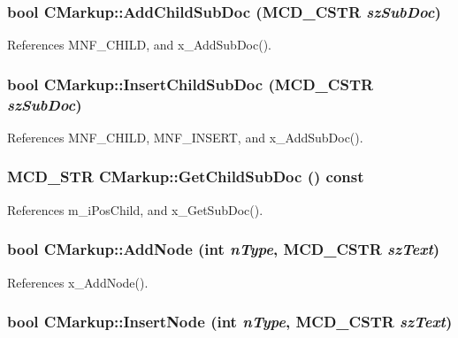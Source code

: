 \subsubsection[AddChildSubDoc]{\setlength{\rightskip}{0pt plus 5cm}bool CMarkup::AddChildSubDoc ({\bf MCD\_\-CSTR} {\em szSubDoc})\hspace{0.3cm}{\tt  [inline]}}\label{classCMarkup_3500f6d0c1ea550bfd70c0dc0b1217c2}




References MNF\_\-CHILD, and x\_\-AddSubDoc().
\subsubsection[InsertChildSubDoc]{\setlength{\rightskip}{0pt plus 5cm}bool CMarkup::InsertChildSubDoc ({\bf MCD\_\-CSTR} {\em szSubDoc})\hspace{0.3cm}{\tt  [inline]}}\label{classCMarkup_f77bad4653eb8a9396844ea0d94c19a7}




References MNF\_\-CHILD, MNF\_\-INSERT, and x\_\-AddSubDoc().
\subsubsection[GetChildSubDoc]{\setlength{\rightskip}{0pt plus 5cm}MCD\_\-STR CMarkup::GetChildSubDoc () const\hspace{0.3cm}{\tt  [inline]}}\label{classCMarkup_5957fb2553a8104d064a5adf1726b838}




References m\_\-iPosChild, and x\_\-GetSubDoc().
\subsubsection[AddNode]{\setlength{\rightskip}{0pt plus 5cm}bool CMarkup::AddNode (int {\em nType}, \/  {\bf MCD\_\-CSTR} {\em szText})\hspace{0.3cm}{\tt  [inline]}}\label{classCMarkup_650eb815a83605636088c30de6f4e6a7}




References x\_\-AddNode().
\subsubsection[InsertNode]{\setlength{\rightskip}{0pt plus 5cm}bool CMarkup::InsertNode (int {\em nType}, \/  {\bf MCD\_\-CSTR} {\em szText})\hspace{0.3cm}{\tt  [inline]}}\label{classCMarkup_3217ba51dd76d42272bb7e2cddfb3102}




